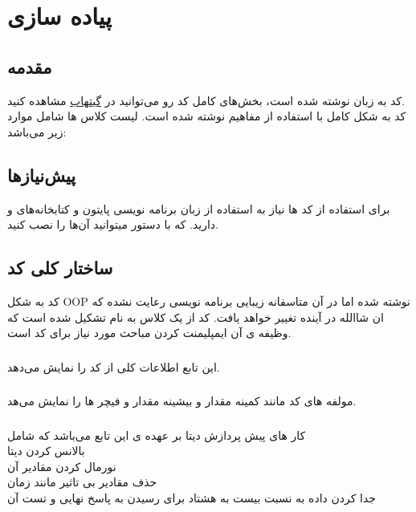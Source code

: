 \chapter{
	پیاده سازی
}

\section{مقدمه}

کد به زبان  نوشته شده است، بخش‌های کامل کد رو می‌توانید در  
\href{https://github.com/MohammadrezaAmani/AI_HW5}{گیتهاب}
مشاهده کنید.\\
کد به شکل کامل با استفاده از مفاهیم  نوشته شده است. لیست کلاس ها شامل موارد زیر می‌باشد:\\


\section{پیش‌نیازها}

برای استفاده از کد ها نیاز به استفاده از زبان برنامه نویسی پایتون و کتابخانه‌های  و  دارید.
که با دستور 
میتوانید آن‌ها را نصب کنید.

\section{ساختار کلی کد}
کد به شکل OOP نوشته شده اما در آن متاسفانه زیبایی برنامه نویسی رعایت نشده که ان شاالله در آینده تغییر خواهد یافت.
کد از یک کلاس به نام  تشکیل شده است که وظیفه ی آن ایمپلیمنت کردن مباحث مورد نیاز برای کد است.


\subsection{}
این تابع اطلاعات کلی از کد را نمایش می‌دهد.

\subsection{}
مولفه های کد مانند کمینه مقدار و بیشینه مقدار و فیچر ها را نمایش می‌هد.
\subsection{}
کار های پیش پردازش دیتا بر عهده ی این تابع می‌باشد که شامل 
\\ 
بالانس کردن دیتا
\\ 
نورمال کردن مقادیر آن
\\ حذف مقادیر بی تاثیر مانند زمان
\\
جدا کردن داده به نسبت بیست به هشتاد برای رسیدن به پاسخ نهایی و تست آن 

